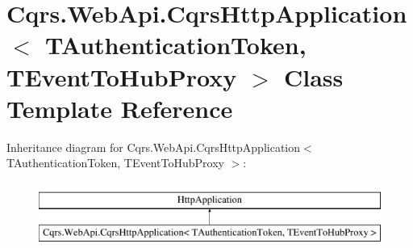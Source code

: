 \hypertarget{classCqrs_1_1WebApi_1_1CqrsHttpApplication}{}\section{Cqrs.\+Web\+Api.\+Cqrs\+Http\+Application$<$ T\+Authentication\+Token, T\+Event\+To\+Hub\+Proxy $>$ Class Template Reference}
\label{classCqrs_1_1WebApi_1_1CqrsHttpApplication}
Inheritance diagram for Cqrs.\+Web\+Api.\+Cqrs\+Http\+Application$<$ T\+Authentication\+Token, T\+Event\+To\+Hub\+Proxy $>$\+:\begin{figure}[H]
\begin{center}
\leavevmode
\includegraphics[height=2.000000cm]{classCqrs_1_1WebApi_1_1CqrsHttpApplication}
\end{center}
\end{figure}
